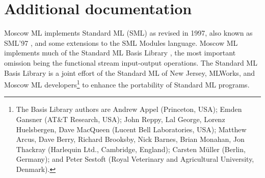 \documentclass[fleqn,a4paper]{article}
\begin{document}
%
%
%
%
%
%
%


\section{Additional documentation}

Moscow ML implements Standard ML (SML) as revised in 1997, also known
as SML'97 \cite{Milner:1990:TheDefinition, Milner:1997:TheDefinition},
and some extensions to the SML Modules language.  Moscow ML implements
much of the Standard ML Basis Library \cite{SMLBasis:1996:StandardML},
the most important omission being the functional stream input-output
operations.  The Standard ML Basis Library is a joint effort of the
Standard ML of New Jersey, MLWorks, and Moscow ML
developers\footnote{The Basis Library authors are Andrew Appel
  (Princeton, USA); Emden Gansner (AT\&T Research, USA); John Reppy,
  Lal George, Lorenz Huelsbergen, Dave MacQueen (Lucent Bell
  Laboratories, USA); Matthew Arcus, Dave Berry, Richard Brooksby,
  Nick Barnes, Brian Monahan, Jon Thackray (Harlequin Ltd., Cambridge,
  England); Carsten M{\"u}ller (Berlin, Germany); and Peter Sestoft
  (Royal Veterinary and Agricultural University, Denmark).} to enhance
the portability of Standard ML programs.
\end{document}
